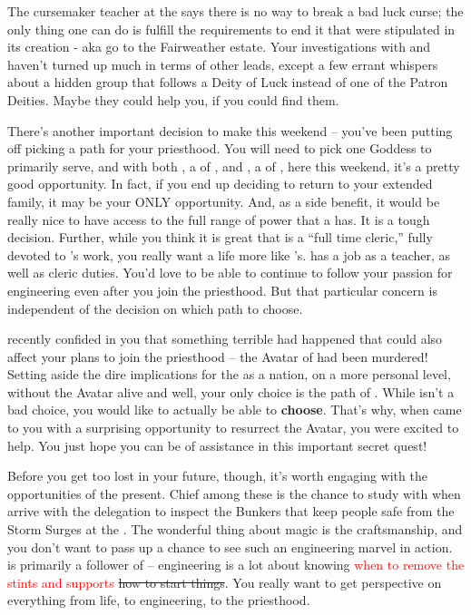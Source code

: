 \documentclass[char]{GL2020}
\begin{document}
The cursemaker teacher at the \pSchool{} says there is no way to break a bad luck curse; the only thing one can do is fulfill the requirements to end it that were stipulated in its creation - aka go to the Fairweather estate. Your investigations with \cPresident{} and \cWarlordDaughter{} haven't turned up much in terms of other leads, except a few errant whispers about a hidden group that follows a Deity of Luck instead of one of the Patron Deities. Maybe they could help you, if you could find them.

There's another important decision to make this weekend – you've been putting off picking a path for your priesthood. You will need to pick one Goddess to primarily serve, and with both \cEbbPriest{\full}, a \cEbbPriest{\cleric} of \cEbbFull{\full}, and \cFlowPriest{\full}, a \cFlowPriest{\cleric} of \cFlowFull{\full}, here this weekend, it's a pretty good opportunity. In fact, if you end up deciding to return to your extended family, it may be your ONLY opportunity. And, as a side benefit, it would be really nice to have access to the full range of power that a \cInitiate{\cleric} has. It is a tough decision. Further, while you think it is great that \cEbbPriest{} is a ``full time cleric,'' fully devoted to \cEbb{}'s work, you really want a life more like \cFlowPriest{\full}'s. \cFlowPriest{} has a job as a teacher, as well as \cFlowPriest{\their} cleric duties. You'd love to be able to continue to follow your passion for engineering even after you join the priesthood. But that particular concern is independent of the decision on which path to choose.

\cFlowPriest{} recently confided in you that something terrible had happened that could also affect your plans to join the priesthood – the Avatar of \cEbb{} had been murdered! Setting aside the dire implications for the \pShip{} as a nation, on a more personal level, without the \cEbb{} Avatar alive and well, your only choice is the path of \cFlow{}. While \cFlow{} isn't a bad choice, you would like to actually be able to \textbf{choose}. That's why, when \cFlowPriest{} came to you with a surprising opportunity to resurrect the Avatar, you were excited to help. You just hope you can be of assistance in this important secret quest!

Before you get too lost in your future, though, it's worth engaging with the opportunities of the present. Chief among these is the chance to study with \cBunker{\full} when \cBunker{\they} arrive\cBunker{\plural} with the \pShip{} delegation to inspect the Bunkers that keep people safe from the Storm Surges at the \pSc{}. The wonderful thing about \pShippie{} magic is the craftsmanship, and you don't want to pass up a chance to see such an engineering marvel in action. \cBunker{} is primarily a follower of \textcolor{red}{\cEbb{}} \sout{\cFlow{}} -- engineering is a lot about knowing \textcolor{red}{when to remove the stints and supports} \sout{how to start things}. You really want to get \cBunker{\their} perspective on everything from life, to engineering, to the priesthood.
\end{document}
